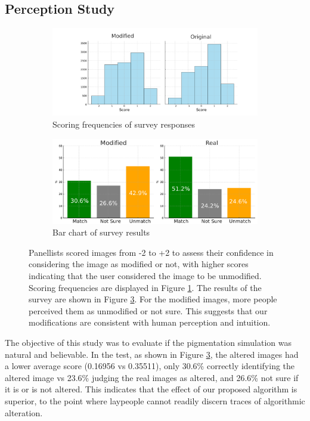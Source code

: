 \begin{spacing}{1.5}
\section{Perception Study}
\begin{figure}[t!]
    \centering
    \begin{subfigure}{.9\textwidth}
        \centering
        \includegraphics[width=0.95\columnwidth]{Chapter5/score.pdf}
        \caption{Scoring frequencies of survey responses}
        \label{fig:survey_hist}
    \end{subfigure}\hfill
    \begin{subfigure}{.9\textwidth}
        \centering
        \includegraphics[width=0.95\columnwidth]{Chapter5/bar_charts_modified.pdf}
        \caption{Bar chart of survey results}
        \label{fig:bar_charts}
    \end{subfigure}
    \caption{Panellists scored images from -2 to +2 to assess their confidence in considering the image as modified or not, with higher scores indicating that the user considered the image to be unmodified. Scoring frequencies are displayed in Figure \ref{fig:survey_hist}. The results of the survey are shown in Figure \ref{fig:bar_charts}. For the modified images, more people perceived them as unmodified or not sure. This suggests that our modifications are consistent with human perception and intuition.}
\end{figure}
The objective of this study was to evaluate if the pigmentation simulation was natural and believable. In the test, as shown in Figure \ref{fig:bar_charts}, the altered images had a lower average score (0.16956 vs 0.35511), only 30.6\% correctly identifying the altered image vs 23.6\% judging the real images as altered, and 26.6\% not sure if it is or is not altered. This indicates that the effect of our proposed algorithm is superior, to the point where laypeople cannot readily discern traces of algorithmic alteration.

\end{spacing}
\newpage
